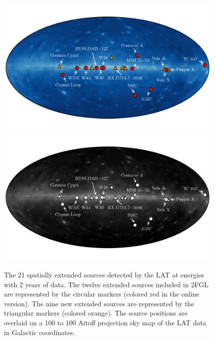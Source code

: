   \begin{figure}[htbp]
      \ifcolorfigure
      \includegraphics{chapters/extended_search/figures/summary_plots/allsky_extended_sources_color.pdf}
      \else
      \includegraphics{chapters/extended_search/figures/summary_plots/allsky_extended_sources_bw.pdf}
      \fi
      \caption{The 21
      spatially extended sources detected by the LAT
      at \gev energies 
      with 2 years of data.  The twelve extended sources included in
      2FGL are represented by the circular markers (colored red in the online
      version).  The nine new extended sources are represented by
      the triangular markers (colored orange).
      The source positions are overlaid on a 100 \mev to 100 \gev 
      Aitoff projection sky map of the LAT data in Galactic coordinates.
}
  \end{figure}


